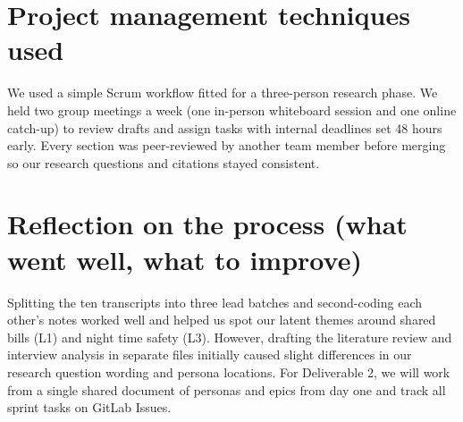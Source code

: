 \documentclass[12pt, a4paper]{article}
\begin{document}
\section*{Project management techniques used}
We used a simple Scrum workflow fitted for a three-person research phase. We held two group meetings a week (one in-person whiteboard session and one online catch-up) to review drafts and assign tasks with internal deadlines set 48 hours early. Every section was peer-reviewed by another team member before merging so our research questions and citations stayed consistent.




\section*{Reflection on the process (what went well, what to improve)}
Splitting the ten transcripts into three lead batches and second-coding each other's notes worked well and helped us spot our latent themes around shared bills (L1) and night time safety (L3). However, drafting the literature review and interview analysis in separate files initially caused slight differences in our research question wording and persona locations. For Deliverable 2, we will work from a single shared document of personas and epics from day one and track all sprint tasks on GitLab Issues.
\end{document}
